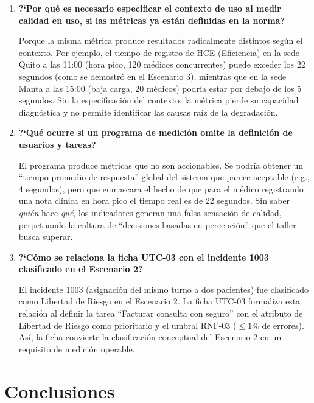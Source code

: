 \documentclass[12pt,a4paper]{article}
\begin{document}
\begin{enumerate}
    \item \textbf{?`Por qu\'e es necesario especificar el contexto de uso al medir calidad en uso, si las m\'etricas ya est\'an definidas en la norma?}

    Porque la misma m\'etrica produce resultados radicalmente distintos seg\'un el contexto. Por ejemplo, el tiempo de registro de HCE (Eficiencia) en la sede Quito a las 11:00 (hora pico, 120 m\'edicos concurrentes) puede exceder los 22 segundos (como se demostr\'o en el Escenario 3), mientras que en la sede Manta a las 15:00 (baja carga, 20 m\'edicos) podr\'ia estar por debajo de los 5 segundos. Sin la especificaci\'on del contexto, la m\'etrica pierde su capacidad diagn\'ostica y no permite identificar las causas ra\'iz de la degradaci\'on.

    \item \textbf{?`Qu\'e ocurre si un programa de medici\'on omite la definici\'on de usuarios y tareas?}

    El programa produce m\'etricas que no son accionables. Se podr\'ia obtener un ``tiempo promedio de respuesta'' global del sistema que parece aceptable (e.g., 4 segundos), pero que enmascara el hecho de que para el m\'edico registrando una nota cl\'inica en hora pico el tiempo real es de 22 segundos. Sin saber \textit{qui\'en} hace \textit{qu\'e}, los indicadores generan una falsa sensaci\'on de calidad, perpetuando la cultura de ``decisiones basadas en percepci\'on'' que el taller busca superar.

    \item \textbf{?`C\'omo se relaciona la ficha UTC-03 con el incidente 1003 clasificado en el Escenario 2?}

    El incidente 1003 (asignaci\'on del mismo turno a dos pacientes) fue clasificado como Libertad de Riesgo en el Escenario 2. La ficha UTC-03 formaliza esta relaci\'on al definir la tarea ``Facturar consulta con seguro'' con el atributo de Libertad de Riesgo como prioritario y el umbral RNF-03 ($\le 1\%$ de errores). As\'i, la ficha convierte la clasificaci\'on conceptual del Escenario 2 en un requisito de medici\'on operable.
\end{enumerate}

\section{Conclusiones}
\end{document}
